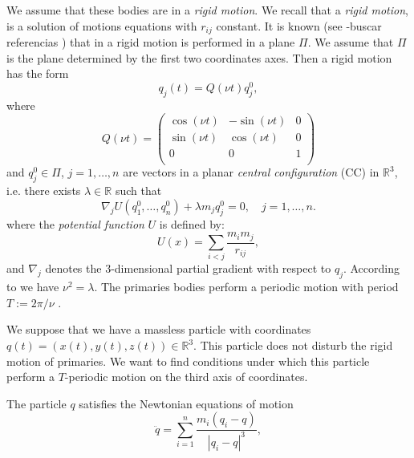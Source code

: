 \documentclass[twoside]{article}
\theoremstyle{remark}
\newcommand{\rr}{\mathbb{R}}
\begin{document}
We assume that these bodies are in a \emph{rigid motion}. We recall that a \emph{rigid  motion}, is a solution of motions equations with $r_{ij}$ constant.  It is known (see -buscar referencias ) that in a rigid motion is performed in a plane $\Pi$. We assume that $\Pi$ is the plane determined by the first two coordinates axes. Then a rigid motion has the form
\[q_j(t)=Q(\nu t)q^0_j,\]
where
\[
 Q(\nu t)=\begin{pmatrix}
           \cos(\nu t) & -\sin(\nu t) & 0\\
           \sin(\nu t) & \cos(\nu t) & 0\\
           0            &     0     &  1\\
          \end{pmatrix}
\]
and $q^0_j\in\Pi$, $j=1,\ldots,n$ are vectors in a planar \emph{central configuration} (CC) in $\rr^3$, i.e. there exists $\lambda\in\rr$ such that
\[ \nabla_jU(q^0_1,\ldots,q^0_n)+\lambda m_jq^0_j=0,\quad j=1,\ldots,n.\]
where the \emph{potential function} $U$ is defined by:
\begin{equation}\label{eq:potencial}
 U(x)=\sum_{i<j}\frac{m_im_j}{r_{ij}},
\end{equation}
and $\nabla_j$ denotes the $3$-dimensional partial gradient with respect to $q_j$.
According to \cite[Eq. (2.16)]{JaumeLlibre276} we have $\nu^2=\lambda$. The primaries bodies perform a periodic motion with period $T:=2\pi/\nu$ .

We suppose that we have a massless particle with coordinates $q(t)=(x(t),y(t),z(t))\in\rr^3$. This particle does not disturb the rigid motion of  primaries.  We want to find conditions under which this particle perform a $T$-periodic motion on the third axis of coordinates.

The particle $q$ satisfies the Newtonian equations of motion
\begin{equation}\label{eq:newton}
 \ddot{q}=\sum_{i=1}^n\frac{m_i(q_i-q)}{|q_i-q|^3},
\end{equation}
\end{document}

